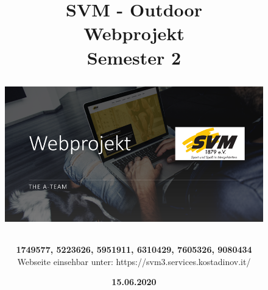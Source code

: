 \documentclass[12pt,a4paper]{article}
\begin{document}
\begin{titlepage}
\title{\vspace*{1cm} \huge{\textbf{SVM - Outdoor}} \\ \textbf{Webprojekt}\\
\textbf{Semester 2}\\
\vspace*{1cm}
\begin{figure}[htb]
\advance\leftskip-2cm
\includegraphics[scale=1.2]{Startseite.png}
\end{figure}
\vspace{2cm}}
\author{\textbf{1749577, 5223626, 5951911, 6310429, 7605326, 9080434}
\vspace*{5mm}\\
Webseite einsehbar unter: https://svm3.services.kostadinov.it/}
\date{\vspace{1cm} \textbf{15.06.2020}}

\end{titlepage}
\maketitle
\newpage
\tableofcontents
\newpage
\end{document}
